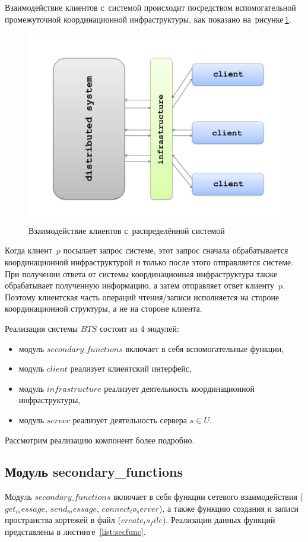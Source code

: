 Взаимодействие клиентов с~системой происходит посредством вспомогательной промежуточной координационной инфраструктуры, как показано на~рисунке\,\ref{clser}.
\begin{figure}[H]
	\centering \includegraphics[width=0.7 \textwidth, height=0.5 \textwidth]{img/ClientServer}  \caption{Взаимодействие клиентов с~распределённой системой} \label{clser}
\end{figure}
Когда клиент~$p$ посылает запрос системе, этот запрос сначала обрабатывается координационной инфраструктурой и только после этого отправляется системе. При получении ответа от системы координационная инфраструктура также обрабатывает полученную информацию, а затем отправляет ответ клиенту~$p$. Поэтому клиентская часть операций чтения/записи исполняется на стороне координационной структуры, а не на стороне клиента.

Реализация системы $BTS$ состоит из 4 модулей:
\begin{itemize}
	\item модуль $secondary\_functions$ включает в себя вспомогательные функции,
	\item модуль $client$ реализует клиентский интерфейс,
	\item модуль $infrastructure$ реализует деятельность координационной инфраструктуры,
	\item модуль $server$ реализует деятельность сервера $s \in U$.
\end{itemize}
Рассмотрим реализацию компонент более подробно.

\subsection{Модуль secondary_functions}\label{subsec:2}
Модуль $secondary\_functions$ включает в себя функции сетевого взаимодействия ($get_message$, $send_message$, $connect_to_server$), а также функцию создания и записи пространства кортежей в файл ($create_ts_file$). Реализации данных функций представлены в листинге~\ref{list:secfunc}.

